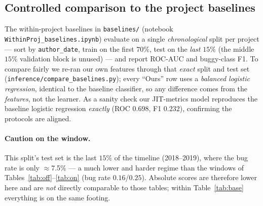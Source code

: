 \documentclass[11pt,a4paper]{article}
\newcommand{\code}[1]{\texttt{#1}}
\begin{document}
\subsection{Controlled comparison to the project baselines}\label{sec:cmp}
The within-project baselines in \texttt{baselines/} (notebook
\texttt{WithinProj\_baselines.ipynb}) evaluate on a single \emph{chronological}
split per project --- sort by \code{author\_date}, train on the first $70\%$,
test on the \emph{last} $15\%$ (the middle $15\%$ validation block is unused) ---
and report ROC-AUC and buggy-class F1. To compare fairly we re-ran our own
features through that \emph{exact} split and test set
(\texttt{inference/compare\_baselines.py}); every ``Ours'' row uses a
\emph{balanced logistic regression}, identical to the baseline classifier, so any
difference comes from the \emph{features}, not the learner. As a sanity check our
JIT-metrics model reproduces the baseline logistic regression \emph{exactly}
(ROC $0.698$, F1 $0.232$), confirming the protocols are aligned.

\paragraph{Caution on the window.} This split's test set is the last $15\%$ of
the timeline (2018--2019), where the bug rate is only $\approx$7.5\% --- a much
lower and harder regime than the windows of
Tables~\ref{tab:off}--\ref{tab:on} (bug rate $0.16$/$0.25$). Absolute scores are
therefore lower here and are \emph{not} directly comparable to those tables;
within Table~\ref{tab:base} everything is on the same footing.
\end{document}
